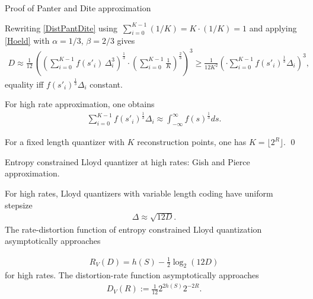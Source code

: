 \begin{frame}{Proof of Panter and Dite approximation}
\bit
\item Rewriting  \eqref{DistPantDite} using $\,\sum_{i=0}^{K-1}(1/K)=K\cdot(1/K)=1$ and applying \eqref{Hoeld} with $\alpha=1/3$, $\beta=2/3$ gives
\begin{align*}
    D \approx
      \frac{1}{12}\,\left(
         \left(
            \sum_{i=0}^{K-1} f(s'_i)\,\Delta_i^3
         \right)^{\!\frac{1}{3}}
         \cdot
         \left(
            \sum_{i=0}^{K-1} \frac{1}{K}
         \right)^{\!\frac{2}{3}}
      \right)^{\!3}
      \geq \frac{1}{12 K^2}\left(\cdot \sum_{i=0}^{K-1}f(s'_i)^{\!\frac{1}{3}}\Delta_i \right)^{\!3},
\end{align*}
equality iff $f(s'_i)^{\!\frac{1}{3}}\Delta_i$ constant.
\item For high rate approximation, one obtains
\begin{align*}
\sum_{i=0}^{K-1}f(s'_i)^{\!\frac{1}{3}}\Delta_i\approx \int _{-\infty}^\infty f(s)^{\!\frac{1}{3}} ds. 
\end{align*}
\item For a fixed length quantizer with $K$ reconstruction points, one has $K=\lfloor 2^R\rfloor$. \qed
\eit

\end{frame}

\begin{frame}{Entropy constrained Lloyd quantizer at high rates: Gish and Pierce approximation.}
\begin{proposition}
For high rates, Lloyd quantizers with variable length coding have uniform stepsize 
\begin{align*}
\Delta\approx \sqrt{12 D}.
\end{align*} 
The rate-distortion function of entropy constrained Lloyd quantization asymptotically approaches

\begin{align*}
R_{V}(D)=h(S)-\frac{1}{2}\log_2(12 D)
\end{align*}
for high rates.
The distortion-rate function asymptotically approaches  
\begin{align*}
D_{V}(R):=\frac{1}{12}2^{2h(S)}2^{-2R}.
\end{align*}
\end{proposition}

\end{frame}


